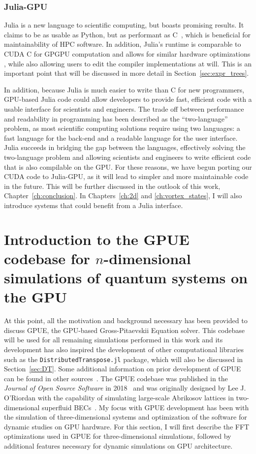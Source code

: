 \subsubsection{Julia-GPU}
Julia is a new language to scientific computing, but boasts promising results.
It claims to be as usable as Python, but as performant as C~\cite{bezanson2017}, which is beneficial for maintainability of HPC software.
In addition, Julia's runtime is comparable to CUDA C for GPGPU computation and allows for similar hardware optimizations \cite{besard2016, besard2018}, while also allowing users to edit the compiler implementations at will.
This is an important point that will be discussed in more detail in Section~\ref{sec:expr_trees}.

In addition, because Julia is much easier to write than C for new programmers, GPU-based Julia code could allow developers to provide fast, efficient code with a usable interface for scientists and engineers.
The trade off between performance and readability in programming has been described as the ``two-language'' problem, as most scientific computing solutions require using two languages: a fast language for the back-end and a readable language for the user interface.
Julia succeeds in bridging the gap between the languages, effectively solving the two-language problem and allowing scientists and engineers to write efficient code that is also compilable on the GPU.
For these reasons, we have begun porting our CUDA code to Julia-GPU, as it will lead to simpler and more maintainable code in the future.
This will be further discussed in the outlook of this work, Chapter~\ref{ch:conclusion}.
In Chapters~\ref{ch:2d} and \ref{ch:vortex_states}, I will also introduce systems that could benefit from a Julia interface.

\section{Introduction to the GPUE codebase for $n$-dimensional simulations of quantum systems on the GPU}
\label{sec:GPUE}

At this point, all the motivation and background necessary has been provided to discuss GPUE, the GPU-based Gross-Pitaevskii Equation solver.
This codebase will be used for all remaining simulations performed in this work and its development has also inspired the development of other computational libraries such as the \texttt{DistributedTranspose.jl} package, which will also be discussed in Section~\ref{sec:DT}.
Some additional information on prior development of GPUE can be found in other sources~\cite{o2017}.
The GPUE codebase was published in the \textit{Journal of Open Source Software} in 2018~\cite{schloss2018} and
was originally designed by Lee J. O'Riordan with the capability of simulating large-scale Abrikosov lattices in two-dimensional superfluid BECs~\cite{o2017, o2016, o2016topo}.
My focus with GPUE development has been with the simulation of three-dimensional systems and optimization of the software for dynamic studies on GPU hardware.
For this section, I will first describe the FFT optimizations used in GPUE for three-dimensional simulations, followed by additional features necessary for dynamic simulations on GPU architecture.

